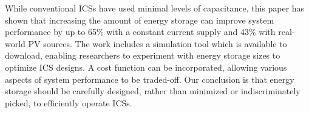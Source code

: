 While conventional ICSs have used minimal levels of capacitance, this paper has shown that increasing the amount of energy storage can improve system performance by up to 65\% with a constant current supply and 43\% with real-world PV sources. The work includes a simulation tool which is available to download, enabling researchers to experiment with energy storage sizes to optimize ICS designs. A cost function can be incorporated, allowing various aspects of system performance to be traded-off. Our conclusion is that energy storage should be carefully designed, rather than minimized or indiscriminately picked, to efficiently operate ICSs.